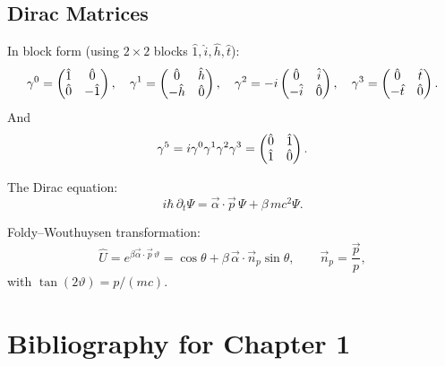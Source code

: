 \subsection{Dirac Matrices}
\label{sec:1.6.7}

In block form (using $2\times 2$ blocks $\hat{1},\hat{i},\hat{h},\hat{t}$):
\[
\gamma^{0} = \begin{pmatrix}\hat{1}&\hat{0}\\\hat{0}&-\hat{1}\end{pmatrix},\quad
\gamma^{1} = \begin{pmatrix}\hat{0}&\hat{h}\\-\hat{h}&\hat{0}\end{pmatrix},\quad
\gamma^{2} = -i\begin{pmatrix}\hat{0}&\hat{i}\\-\hat{i}&\hat{0}\end{pmatrix},\quad
\gamma^{3} = \begin{pmatrix}\hat{0}&\hat{t}\\-\hat{t}&\hat{0}\end{pmatrix}.
\]
And
\[
\gamma^{5} = i\gamma^{0}\gamma^{1}\gamma^{2}\gamma^{3}
= \begin{pmatrix}\hat{0}&\hat{1}\\\hat{1}&\hat{0}\end{pmatrix}.
\]

The Dirac equation:
\[
i\hbar\,\partial_{t}\Psi = \vec{\alpha}\!\cdot\!\vec{p}\,\Psi + \beta\,mc^{2}\Psi.
\]

Foldy--Wouthuysen transformation:
\[
\hat{U} = e^{\beta\vec{\alpha}\!\cdot\!\vec{p}\,\vartheta}
= \cos\theta + \beta\,\vec{\alpha}\!\cdot\!\vec{n}_{p}\sin\theta,\qquad
\vec{n}_{p} = \frac{\vec{p}}{p},
\]
with $\tan(2\vartheta) = p/(mc)$.

\section*{Bibliography for Chapter 1}

